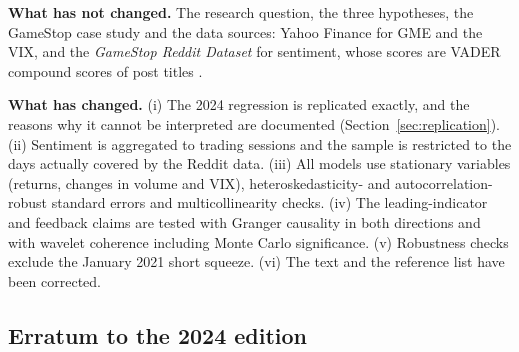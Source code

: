 \documentclass[11pt,a4paper]{article}
\begin{document}
\noindent\colorbox{edition}{\begin{minipage}{0.97\textwidth}\small
\vspace{4pt}
\textbf{What has not changed.} The research question, the three hypotheses, the
GameStop case study and the data sources: Yahoo Finance for GME and the VIX, and
the \emph{GameStop Reddit Dataset} \citep{han2023} for sentiment, whose scores are
VADER compound scores of post titles \citep{hutto2014}.

\smallskip
\textbf{What has changed.} (i) The 2024 regression is replicated exactly, and the
reasons why it cannot be interpreted are documented (Section~\ref{sec:replication}).
(ii) Sentiment is aggregated to trading sessions and the sample is restricted to
the days actually covered by the Reddit data. (iii) All models use stationary
variables (returns, changes in volume and VIX), heteroskedasticity- and
autocorrelation-robust standard errors and multicollinearity checks. (iv) The
leading-indicator and feedback claims are tested with Granger causality in both
directions and with wavelet coherence including Monte Carlo significance.
(v) Robustness checks exclude the January 2021 short squeeze. (vi) The text and
the reference list have been corrected.
\vspace{4pt}
\end{minipage}}

\bigskip
{\setcounter{tocdepth}{1}\small\tableofcontents}

\subsection*{Erratum to the 2024 edition}
\end{document}
